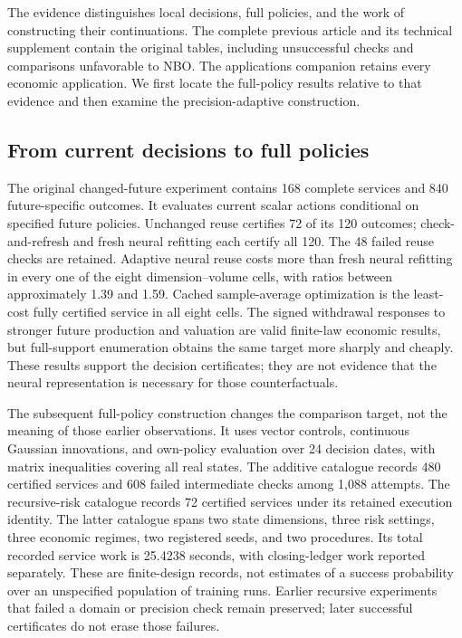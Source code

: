 \documentclass[ecta,nameyear,draft]{econsocart}
\theoremstyle{definition}
\theoremstyle{remark}
\begin{document}
The evidence distinguishes local decisions, full policies, and the work of
constructing their continuations. The complete previous article and its
technical supplement contain the original tables, including unsuccessful
checks and comparisons unfavorable to NBO. The applications companion
retains every economic application. We first locate the full-policy results
relative to that evidence and then examine the precision-adaptive construction.

\subsection{From current decisions to full policies}
The original changed-future experiment contains 168 complete services and
840 future-specific outcomes. It evaluates current scalar actions conditional
on specified future policies. Unchanged reuse certifies 72 of its 120 outcomes;
check-and-refresh and fresh neural refitting each certify all 120. The 48
failed reuse checks are retained. Adaptive neural reuse costs more than fresh
neural refitting in every one of the eight dimension--volume cells, with
ratios between approximately 1.39 and 1.59. Cached sample-average optimization
is the least-cost fully certified service in all eight cells. The signed
withdrawal responses to stronger future production and valuation are valid
finite-law economic results, but full-support enumeration obtains the same
target more sharply and cheaply. These results support the decision
certificates; they are not evidence that the neural representation is
necessary for those counterfactuals.

The subsequent full-policy construction changes the comparison target, not
the meaning of those earlier observations. It uses vector controls,
continuous Gaussian innovations, and own-policy evaluation over 24 decision
dates, with matrix inequalities covering all real states. The additive
catalogue records 480 certified services and 608 failed intermediate checks
among 1,088 attempts. The recursive-risk catalogue records 72 certified
services under its retained execution identity. The latter catalogue spans
two state dimensions, three risk settings, three economic regimes, two
registered seeds, and two procedures. Its total recorded service work is
25.4238 seconds, with closing-ledger work reported separately. These are
finite-design records, not estimates of a success probability over an
unspecified population of training runs. Earlier recursive experiments
that failed a domain or precision check remain preserved; later successful
certificates do not erase those failures.
\end{document}
